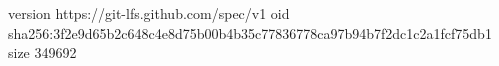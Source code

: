 version https://git-lfs.github.com/spec/v1
oid sha256:3f2e9d65b2c648c4e8d75b00b4b35c77836778ca97b94b7f2dc1c2a1fcf75db1
size 349692

